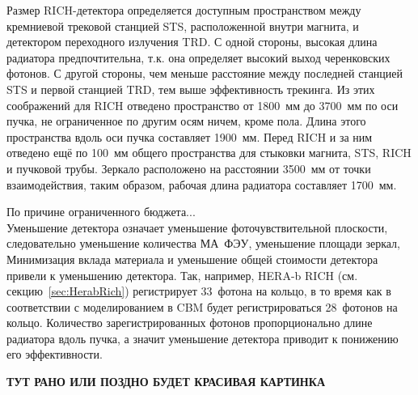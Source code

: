 Размер RICH-детектора определяется доступным пространством между кремниевой трековой станцией STS, расположенной внутри магнита, и детектором переходного излучения TRD. С одной стороны, высокая длина радиатора предпочтительна, т.к. она определяет высокий выход черенковских фотонов. С другой стороны, чем меньше расстояние между последней станцией STS и первой станцией TRD, тем выше эффективность трекинга. Из этих соображений для RICH отведено пространство от 1800~мм до 3700~мм по оси пучка, не ограниченное по другим осям ничем, кроме пола. Длина этого пространства вдоль оси пучка составляет 1900~мм. Перед RICH и за ним отведено ещё по 100~мм общего пространства для стыковки магнита, STS, RICH и пучковой трубы. Зеркало расположено на расстоянии 3500~мм от точки взаимодействия, таким образом, рабочая длина радиатора составляет 1700~мм.


По причине ограниченного бюджета... \\
Уменьшение детектора означает уменьшение фоточувствительной плоскости, следовательно уменьшение количества МА~ФЭУ, уменьшение площади зеркал, 
Минимизация вклада материала и уменьшение общей стоимости детектора привели к уменьшению детектора.
Так, например, HERA-b RICH (см. секцию~\ref{sec:HerabRich}) регистрирует 33~фотона на кольцо, в то время как в соответствии с моделированием в CBM будет регистрироваться 28~фотонов на кольцо.
Количество зарегистрированных фотонов пропорционально длине радиатора вдоль пучка, а значит уменьшение детектора приводит к понижению его эффективности.

\textbf{ТУТ РАНО ИЛИ ПОЗДНО БУДЕТ КРАСИВАЯ КАРТИНКА}

